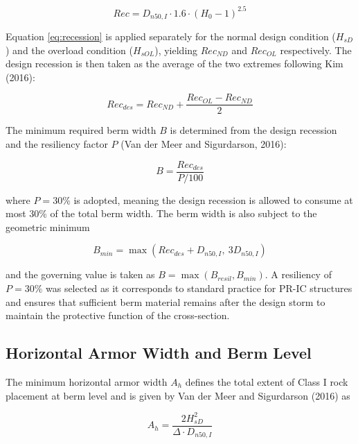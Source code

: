 \documentclass[a4paper, 11pt]{article}
\begin{document}
\begin{equation}
    Rec = D_{n50,I} \cdot 1.6 \cdot (H_0 - 1)^{2.5}
    \label{eq:recession}
\end{equation}

Equation \ref{eq:recession} is applied separately for the normal design condition ($H_{sD}$) and the overload condition ($H_{sOL}$), yielding $Rec_{ND}$ and $Rec_{OL}$ respectively. The design recession is then taken as the average of the two extremes following Kim (2016):

\begin{equation}
    Rec_{des} = Rec_{ND} + \frac{Rec_{OL} - Rec_{ND}}{2}
    \label{eq:rec_des}
\end{equation}

The minimum required berm width $B$ is determined from the design recession and the resiliency factor $P$ (Van der Meer and Sigurdarson, 2016):

\begin{equation}
    B = \frac{Rec_{des}}{P/100}
    \label{eq:berm_width}
\end{equation}

where $P = 30\%$ is adopted, meaning the design recession is allowed to consume at most 30\% of the total berm width. The berm width is also subject to the geometric minimum

\begin{equation}
    B_{min} = \max(Rec_{des} + D_{n50,I},\ 3 D_{n50,I})
    \label{eq:berm_min}
\end{equation}

and the governing value is taken as $B = \max(B_{resil}, B_{min})$. A resiliency of $P = 30\%$ was selected as it corresponds to standard practice for PR-IC structures and ensures that sufficient berm material remains after the design storm to maintain the protective function of the cross-section.

\subsection{Horizontal Armor Width and Berm Level}
\hspace{0.5cm}The minimum horizontal armor width $A_h$ defines the total extent of Class I rock placement at berm level and is given by Van der Meer and Sigurdarson (2016) as

\begin{equation}
    A_h = \frac{2 H_{sD}^2}{\Delta \cdot D_{n50,I}}
    \label{eq:Ah}
\end{equation}
\end{document}
